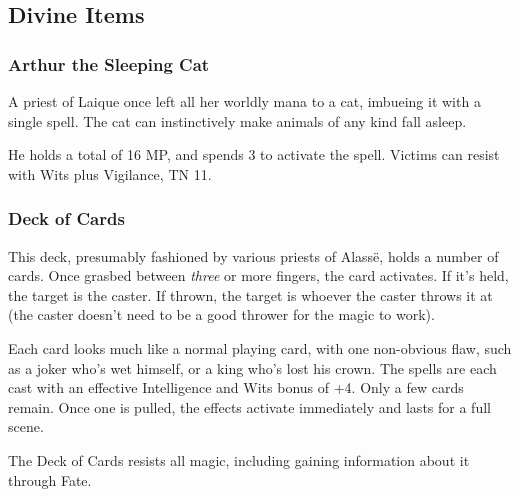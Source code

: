 \subsection{Divine Items}

\subsubsection{Arthur the Sleeping Cat}
A priest of Laique once left all her worldly mana to a cat, imbueing it with a single spell.  The cat can instinctively make animals of any kind fall asleep.

He holds a total of 16 MP, and spends 3 to activate the spell.  Victims can resist with Wits plus Vigilance, TN 11.

\subsubsection{Deck of Cards}\label{deckofmanythings}
This deck, presumably fashioned by various priests of Alass\"{e}, holds a number of cards.  Once grasbed between \emph{three} or more fingers, the card activates.  If it's held, the target is the caster.  If thrown, the target is whoever the caster throws it at (the caster doesn't need to be a good thrower for the magic to work).

Each card looks much like a normal playing card, with one non-obvious flaw, such as a joker who's wet himself, or a king who's lost his crown.  The spells are each cast with an effective Intelligence and Wits bonus of +4.  Only a few cards remain.  Once one is pulled, the effects activate immediately and lasts for a full scene.

The Deck of Cards resists all magic, including gaining information about it through Fate.

